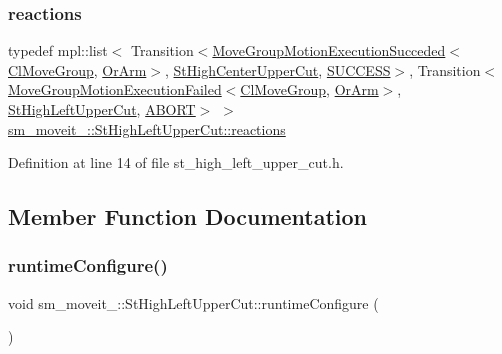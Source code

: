 \subsubsection{\texorpdfstring{reactions}{reactions}}
{\footnotesize\ttfamily typedef mpl\+::list$<$ Transition$<$\hyperlink{structmoveit__z__client_1_1MoveGroupMotionExecutionSucceded}{Move\+Group\+Motion\+Execution\+Succeded}$<$\hyperlink{classmoveit__z__client_1_1ClMoveGroup}{Cl\+Move\+Group}, \hyperlink{classsm__moveit__3_1_1OrArm}{Or\+Arm}$>$, \hyperlink{structsm__moveit__3_1_1StHighCenterUpperCut}{St\+High\+Center\+Upper\+Cut}, \hyperlink{classSUCCESS}{S\+U\+C\+C\+E\+SS}$>$, Transition$<$\hyperlink{structmoveit__z__client_1_1MoveGroupMotionExecutionFailed}{Move\+Group\+Motion\+Execution\+Failed}$<$\hyperlink{classmoveit__z__client_1_1ClMoveGroup}{Cl\+Move\+Group}, \hyperlink{classsm__moveit__3_1_1OrArm}{Or\+Arm}$>$, \hyperlink{structsm__moveit__3_1_1StHighLeftUpperCut}{St\+High\+Left\+Upper\+Cut}, \hyperlink{classABORT}{A\+B\+O\+RT}$>$ $>$ \hyperlink{structsm__moveit__3_1_1StHighLeftUpperCut_a26a27ee4a7e89a86f60919e51ef9a51b}{sm\+\_\+moveit\+\_\+::\+St\+High\+Left\+Upper\+Cut\+::reactions}}



Definition at line 14 of file st\+\_\+high\+\_\+left\+\_\+upper\+\_\+cut.\+h.



\subsection{Member Function Documentation}
\mbox{\label{structsm__moveit__3_1_1StHighLeftUpperCut_a7e6c9b36cd6246271da8ae42bf35e9ad}} 
\subsubsection{\texorpdfstring{runtime\+Configure()}{runtimeConfigure()}}
{\footnotesize\ttfamily void sm\+\_\+moveit\+\_\+::\+St\+High\+Left\+Upper\+Cut\+::runtime\+Configure (\begin{DoxyParamCaption}{ }\end{DoxyParamCaption})\hspace{0.3cm}{\ttfamily [inline]}}



